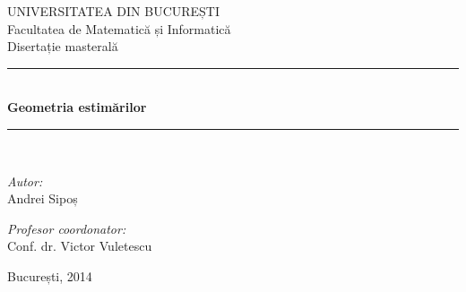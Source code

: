 \documentclass[13pt,openany]{book}
\begin{document}
\newtheorem{teo}{\bf Teorema}[chapter]
\newtheorem{cor}[teo]{\bf Corolarul}
\newtheorem{lema}[teo]{\bf Lema}
\newtheorem{prob}[teo]{\bf Problema}
\newtheorem{conj}[teo]{\bf Conjectura}
\newtheorem{propr}[teo]{\bf Proprietatea}
\newtheorem{prop}[teo]{\bf Propoziția}
\newtheorem{alg}[teo]{\bf Algoritmul}
\theoremstyle{remark}
\newtheorem{obs}[teo]{\bf Observația}
\newtheorem{obss}[teo]{\bf Observațiile}
\newtheorem{ex}[teo]{\bf Exemplul}
\newtheorem{exs}[teo]{\bf Exemplele}
\theoremstyle{definition}
\newtheorem{defi}[teo]{\bf Definiția}

\newcommand{\calm}{\mathcal{M}}
\newcommand{\Qell}{\mathbb{Q}_\ell}

\setcounter{page}{1}
\fontsize{4.3mm}{6mm}\selectfont
\pagestyle{empty}
\begin{center}

\LARGE UNIVERSITATEA DIN BUCUREȘTI\\[0.5cm]
\LARGE Facultatea de Matematică și Informatică\\[3cm]

\Large Disertație masterală\\[3.5cm] 
 
\rule{8cm}{0.5mm}\\[0.8cm]
{ \huge \bfseries Geometria estimărilor}\\[0.2cm]
\rule{8cm}{0.5mm}\\[2.5cm]

\begin{minipage}{0.4\textwidth}
\begin{flushleft} \large
\emph{Autor:}\\
Andrei Sipoș
\end{flushleft}
\end{minipage}
\begin{minipage}{0.5\textwidth}
\begin{flushright} \large
\emph{Profesor coordonator:} \\
Conf. dr. Victor Vuletescu
\end{flushright}
\end{minipage}

\vfill

{\large București, 2014}

\end{center}
\newpage
\phantom{X}
\newpage

\tableofcontents

\newpage
\phantom{X}
\newpage

\setlength{\parskip}{1.5ex plus 0.5ex minus 0.2ex}
\end{document}
